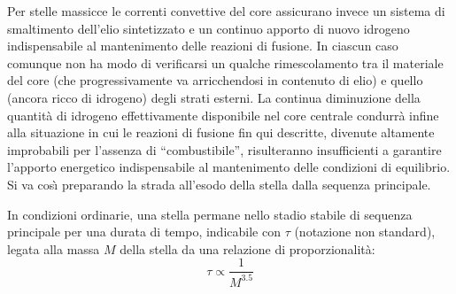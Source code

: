 \par
Per stelle massicce le correnti convettive del core assicurano invece un sistema di smaltimento dell'elio sintetizzato e un continuo apporto di nuovo idrogeno indispensabile al mantenimento delle reazioni di fusione.
In ciascun caso comunque non ha modo di verificarsi un qualche rimescolamento tra il materiale del core (che progressivamente va arricchendosi in contenuto di elio) e quello (ancora ricco di idrogeno) degli strati esterni.
La continua diminuzione della quantit\`{a} di idrogeno effettivamente disponibile  nel core centrale condurr\`{a} infine alla situazione in cui le reazioni di fusione fin qui descritte, divenute altamente improbabili per l'assenza di ``combustibile'', risulteranno insufficienti a garantire l'apporto energetico indispensabile al mantenimento delle condizioni di equilibrio.
Si va cos\`{\i}{} preparando la strada all'esodo della stella dalla sequenza principale.
\par

\smallskip

In condizioni ordinarie, una stella permane nello stadio stabile di sequenza principale per una durata di tempo, indicabile con $\tau$ (notazione non standard), legata alla massa $M$ della stella da una relazione di proporzionalit\`{a}:
\begin{equation}\label{timelife}
\tau \propto \frac{1}{M^{3.5}}
\end{equation}
%
